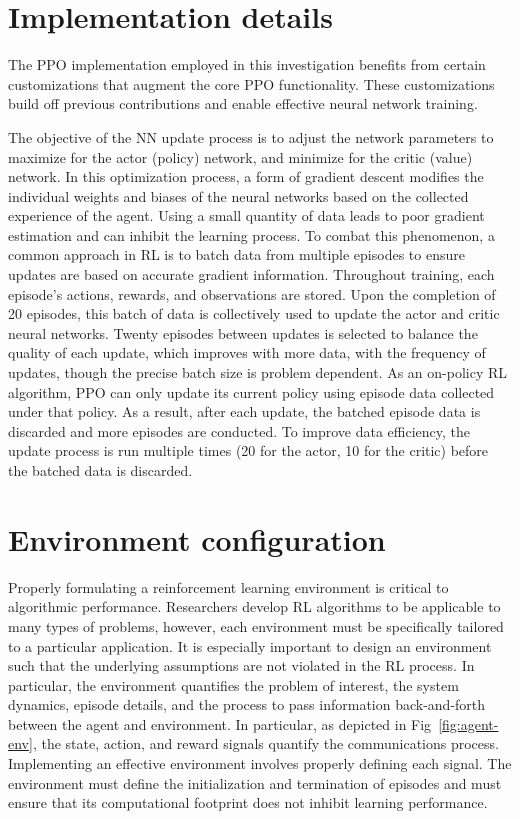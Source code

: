 \documentclass[conference]{IEEEtran}
\begin{document}
\section{Implementation details}
The PPO implementation employed in this investigation benefits from certain customizations that augment the core PPO functionality. These customizations build off previous contributions and enable effective neural network training. 

The objective of the NN update process is to adjust the network parameters to maximize for the actor (policy) network, and minimize for the critic (value) network. In this optimization process, a form of gradient descent modifies the individual weights and biases of the neural networks based on the collected experience of the agent. Using a small quantity of data leads to poor gradient estimation and can inhibit the learning process. To combat this phenomenon, a common approach in RL is to batch data from multiple episodes to ensure updates are based on accurate gradient information. Throughout training, each episode's actions, rewards, and observations are stored. Upon the completion of 20 episodes, this batch of data is collectively used to update the actor and critic neural networks. Twenty episodes between updates is selected to balance the quality of each update, which improves with more data, with the frequency of updates, though the precise batch size is problem dependent. As an on-policy RL algorithm, PPO can only update its current policy using episode data collected under that policy. As a result, after each update, the batched episode data is discarded and more episodes are conducted. To improve data efficiency, the update process is run multiple times (20 for the actor, 10 for the critic) before the batched data is discarded.

\section{Environment configuration}
Properly formulating a reinforcement learning environment is critical to algorithmic performance. Researchers develop RL algorithms to be applicable to many types of problems, however, each environment must be specifically tailored to a particular application. It is especially important to design an environment such that the underlying assumptions are not violated in the RL process. In particular, the environment quantifies the problem of interest, the system dynamics, episode details, and the process to pass information back-and-forth between the agent and environment. In particular, as depicted in Fig~\ref{fig:agent-env}, the state, action, and reward signals quantify the communications process. Implementing an effective environment involves properly defining each signal. The environment must define the initialization and termination of episodes and must ensure that its computational footprint does not inhibit learning performance.
\end{document}
